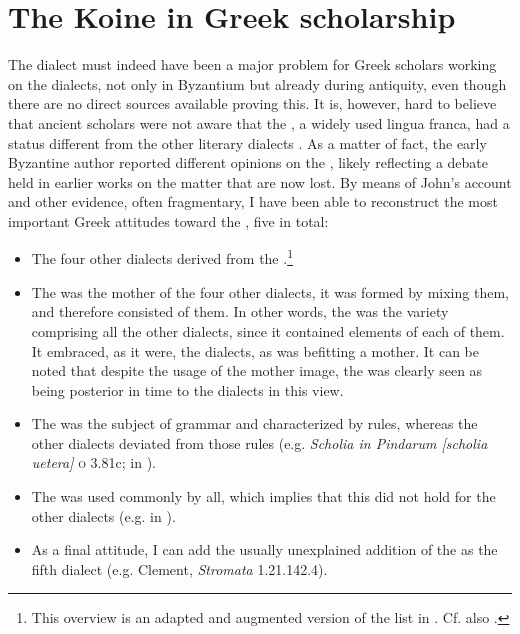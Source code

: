 \section{The Koine in Greek scholarship}\label{sec:2.3}

The  dialect must indeed have been a major problem for Greek scholars working on the dialects, not only in Byzantium but already during antiquity, even though there are no direct sources available proving this. It is, however, hard to believe that ancient scholars were not aware that the , a widely used lingua franca, had a status different from the other literary dialects \citep{Consani2000}. As a matter of fact, the early Byzantine author  reported different opinions on the , likely reflecting a debate held in earlier works on the matter that are now lost. By means of John’s account and other evidence, often fragmentary, I have been able to reconstruct the most important Greek attitudes toward the , five in total:

\begin{itemize}
\item 
The four other dialects derived from the .\footnote{This overview is an adapted and augmented version of the list in \citet[209]{VanRooy2016b}. Cf. also \citet[614--617]{Consani2000}.}

\item 
The  was the mother of the four other dialects, it was formed by mixing them, and therefore consisted of them. In other words, the  was the variety comprising all the other dialects, since it contained elements of each of them. It embraced, as it were, the dialects, as was befitting a mother. It can be noted that despite the usage of the mother image, the  was clearly seen as being posterior in time to the dialects in this view.

\item 
The  was the subject of grammar and characterized by rules, whereas the other dialects deviated from those rules (e.g. \textit{Scholia in Pindarum [scholia uetera]} \textsc{o} 3.81c;  in \citealt[236\textsc{\textsuperscript{v}}]{Manutius1496Thesaurus}).

\item 
The  was used commonly by all, which implies that this did not hold for the other dialects (e.g.  in \citealt[236\textsc{\textsuperscript{v}}]{Manutius1496Thesaurus}).

\item 
As a final attitude, I can add the usually unexplained addition of the  as the fifth dialect (e.g. Clement, \textit{Stromata} 1.21.142.4).
\end{itemize}

